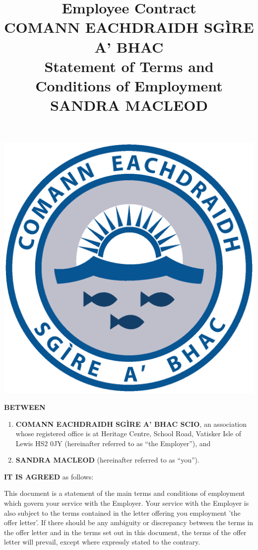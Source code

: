 \documentclass[a4paper,11pt,onecolumn ]{article}
\title{%
  Employee Contract \\
  COMANN EACHDRAIDH SGÌRE A' BHAC \\
  \large Statement of Terms and Conditions of Employment \\
  SANDRA MACLEOD
  }
\begin{document}
\maketitle

\begin{center}
\includegraphics[width=0.3\paperwidth]{cebac-logo}
\end{center}

\pagebreak

\tableofcontents

\pagebreak


\textbf{BETWEEN}
\begin{enumerate}[label=\alph*)]
\item \textbf{COMANN EACHDRAIDH SGÌRE A' BHAC SCIO}, an association whose registered office is at 
Heritage Centre, School Road, Vatisker Isle of Lewis HS2 0JY (hereinafter referred to as 
``the Employer''), and

\item \textbf{SANDRA MACLEOD} (hereinafter referred to as ``you'').
\end{enumerate}

\textbf{IT IS AGREED} as follows:



\begin{legal}
\item 
{}
This document is a statement of the main terms and conditions of employment
which govern your service with the Employer. Your service with the Employer is
also subject to the terms contained in the letter offering you employment 'the offer
letter'. If there should be any ambiguity or discrepancy between the terms in the
offer letter and in the terms set out in this document, the terms of the offer letter
will prevail, except where expressly stated to the contrary.
\end{legal}
\end{document}
